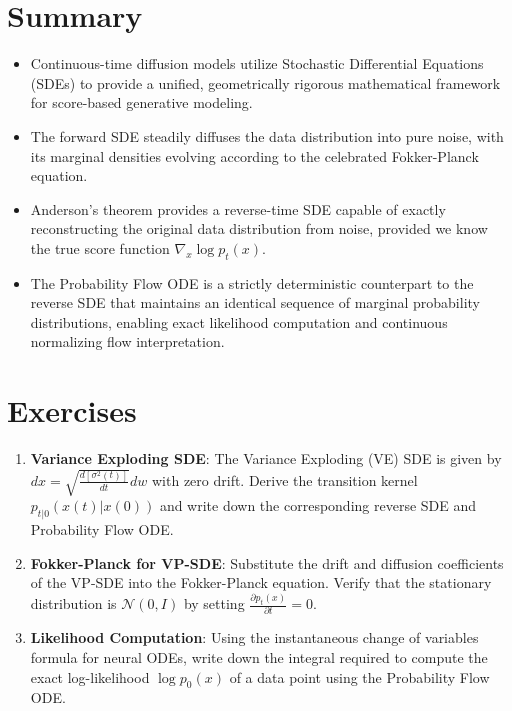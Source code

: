 \section{Summary}
\begin{itemize}
    \item Continuous-time diffusion models utilize Stochastic Differential Equations (SDEs) to provide a unified, geometrically rigorous mathematical framework for score-based generative modeling.
    \item The forward SDE steadily diffuses the data distribution into pure noise, with its marginal densities evolving according to the celebrated Fokker-Planck equation.
    \item Anderson's theorem provides a reverse-time SDE capable of exactly reconstructing the original data distribution from noise, provided we know the true score function $\nabla_x \log p_t(x)$.
    \item The Probability Flow ODE is a strictly deterministic counterpart to the reverse SDE that maintains an identical sequence of marginal probability distributions, enabling exact likelihood computation and continuous normalizing flow interpretation.
\end{itemize}

\section{Exercises}
\begin{enumerate}
    \item \textbf{Variance Exploding SDE}: The Variance Exploding (VE) SDE is given by $dx = \sqrt{\frac{d [\sigma^2(t)]}{dt}} dw$ with zero drift. Derive the transition kernel $p_{t|0}(x(t)|x(0))$ and write down the corresponding reverse SDE and Probability Flow ODE.
    \item \textbf{Fokker-Planck for VP-SDE}: Substitute the drift and diffusion coefficients of the VP-SDE into the Fokker-Planck equation. Verify that the stationary distribution is $\mathcal{N}(0, I)$ by setting $\frac{\partial p_t(x)}{\partial t} = 0$.
    \item \textbf{Likelihood Computation}: Using the instantaneous change of variables formula for neural ODEs, write down the integral required to compute the exact log-likelihood $\log p_0(x)$ of a data point using the Probability Flow ODE.
\end{enumerate}

